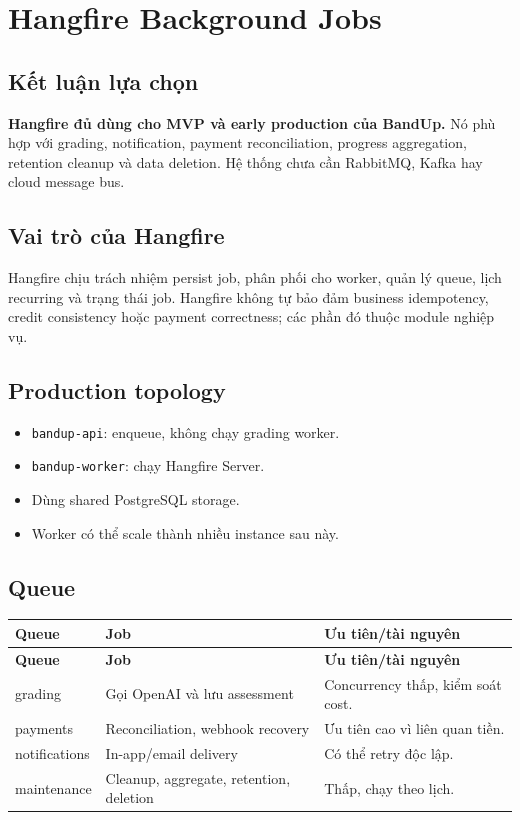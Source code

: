 \documentclass[11pt,a4paper]{article}
\begin{document}
\section{Hangfire Background Jobs}

\subsection{Kết luận lựa chọn}
\begin{decisionbox}
\textbf{Hangfire đủ dùng cho MVP và early production của BandUp.} Nó phù hợp với grading, notification, payment reconciliation, progress aggregation, retention cleanup và data deletion. Hệ thống chưa cần RabbitMQ, Kafka hay cloud message bus.
\end{decisionbox}

\subsection{Vai trò của Hangfire}
Hangfire chịu trách nhiệm persist job, phân phối cho worker, quản lý queue, lịch recurring và trạng thái job. Hangfire không tự bảo đảm business idempotency, credit consistency hoặc payment correctness; các phần đó thuộc module nghiệp vụ.

\subsection{Production topology}
\begin{itemize}
  \item \texttt{bandup-api}: enqueue, không chạy grading worker.
  \item \texttt{bandup-worker}: chạy Hangfire Server.
  \item Dùng shared PostgreSQL storage.
  \item Worker có thể scale thành nhiều instance sau này.
\end{itemize}

\subsection{Queue}
\begin{longtable}{|P{0.22\textwidth}|P{0.35\textwidth}|P{0.32\textwidth}|}
\hline
\textbf{Queue} & \textbf{Job} & \textbf{Ưu tiên/tài nguyên} \\ \hline
\endfirsthead
\hline
\textbf{Queue} & \textbf{Job} & \textbf{Ưu tiên/tài nguyên} \\ \hline
\endhead
grading & Gọi OpenAI và lưu assessment & Concurrency thấp, kiểm soát cost. \\ \hline
payments & Reconciliation, webhook recovery & Ưu tiên cao vì liên quan tiền. \\ \hline
notifications & In-app/email delivery & Có thể retry độc lập. \\ \hline
maintenance & Cleanup, aggregate, retention, deletion & Thấp, chạy theo lịch. \\ \hline
\end{longtable}
\end{document}

